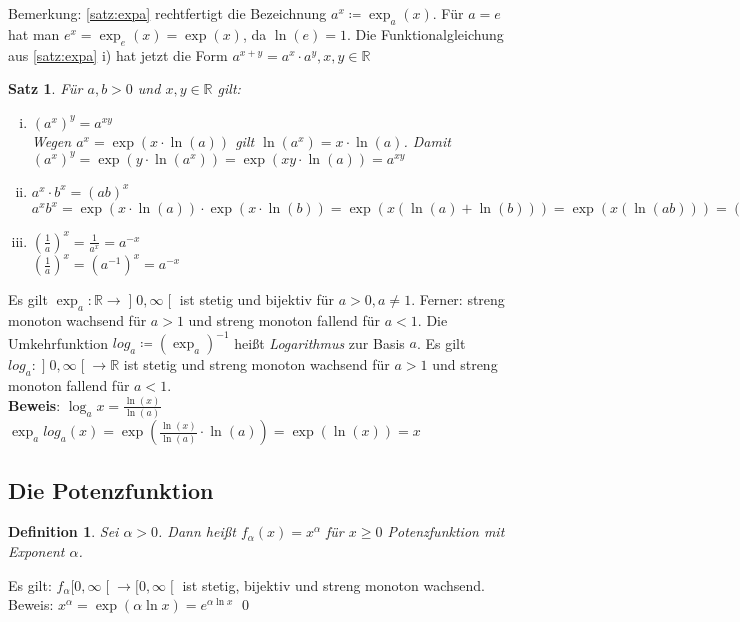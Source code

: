 \documentclass[ngerman,titlepage,twoside, parskip=half*]{scrreprt}
\newcommand*{\R}{\mathbb{R}}
\theoremstyle{break}
\newtheorem{theorem}{Satz}[section]
\newtheorem{definition}{Definition}[chapter]
\theoremstyle{nonumberbreak}
\newcommand*{\rsofint}[1]{[#1\mathclose{[}}  %
\newcommand*{\bsofint}[1]{\mathopen{]}#1\mathclose{[}} %
\begin{document}
Bemerkung: \autoref{satz:expa} rechtfertigt die Bezeichnung $a^x\coloneqq \exp_a(x)$. Für $a=e$ hat man $e^x=\exp_e(x)=\exp(x)$, 
da $\ln(e)=1$. Die Funktionalgleichung aus \autoref{satz:expa} i) hat jetzt die Form $a^{x+y}=a^x\cdot a^y, x,y\in \R$

\begin{theorem}
Für $a,b>0$ und $x,y\in \R$ gilt:
\begin{enumerate}[i)]
  \item $(a^x)^y=a^{xy}$\\
    Wegen $a^x=\exp(x \cdot \ln(a))$ gilt $\ln (a^x)=x \cdot \ln (a)$. Damit $(a^x)^y=\exp(y\cdot \ln(a^x))=\exp(xy\cdot \ln(a))
    =a^{xy}$
  \item $a^x\cdot b^x=(ab)^x$\\
    $a^xb^x=\exp(x\cdot \ln(a))\cdot \exp(x\cdot \ln(b))=\exp(x(\ln(a)+\ln(b)))=\exp(x(\ln(ab)))=(ab)^x$
  \item $(\frac{1}{a})^x=\frac{1}{a^x}=a^{-x}$\\
    $(\frac{1}{a})^x=(a^{-1})^x=a^{-x}$
\end{enumerate}
\end{theorem}

Es gilt $\exp_a \colon\R\rightarrow \bsofint{0,\infty}$ ist stetig und bijektiv für $a>0, a\neq 1$. Ferner: streng monoton wachsend
für $a>1$ und streng monoton fallend für $a<1$.
Die Umkehrfunktion $log_a\coloneqq(\exp_a)^{-1}$ heißt \emph{Logarithmus} zur Basis $a$. Es gilt $log_a\colon
\bsofint{0,\infty} \rightarrow \R$ ist stetig und streng monoton wachsend für $a>1$ und streng monoton fallend für $a<1$.\\
\textbf{Beweis}: $\log_ax=\frac{\ln(x)}{\ln(a)}$\\
$\exp_alog_a(x)=\exp(\frac{\ln(x)}{\ln(a)}\cdot \ln (a))=\exp (\ln (x))=x$

\subsection{Die Potenzfunktion}
\begin{definition}
Sei $\alpha>0$. Dann heißt $f_{\alpha}(x)=x^{\alpha}$ für $x\geq 0$ \emph{Potenzfunktion}
mit Exponent $\alpha$.
\end{definition}

Es gilt: $f_{\alpha}\rsofint{0,\infty}\rightarrow \rsofint{0,\infty}$ ist stetig, bijektiv und streng monoton
wachsend.\\
Beweis: $x^{\alpha}=\exp(\alpha \ln x)=e^{\alpha \ln x}$
\qed
\end{document}

